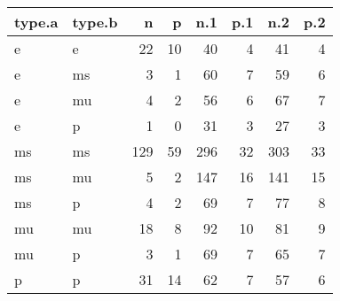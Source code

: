 \captionsetup[table]{labelformat=empty,skip=1pt}
\begin{longtable}{llrrrrrr}
\toprule
type.a & type.b & n & p & n.1 & p.1 & n.2 & p.2 \\ 
\midrule
e & e & 22 & 10 & 40 & 4 & 41 & 4 \\ 
e & ms & 3 & 1 & 60 & 7 & 59 & 6 \\ 
e & mu & 4 & 2 & 56 & 6 & 67 & 7 \\ 
e & p & 1 & 0 & 31 & 3 & 27 & 3 \\ 
ms & ms & 129 & 59 & 296 & 32 & 303 & 33 \\ 
ms & mu & 5 & 2 & 147 & 16 & 141 & 15 \\ 
ms & p & 4 & 2 & 69 & 7 & 77 & 8 \\ 
mu & mu & 18 & 8 & 92 & 10 & 81 & 9 \\ 
mu & p & 3 & 1 & 69 & 7 & 65 & 7 \\ 
p & p & 31 & 14 & 62 & 7 & 57 & 6 \\ 
 \bottomrule
\end{longtable}

